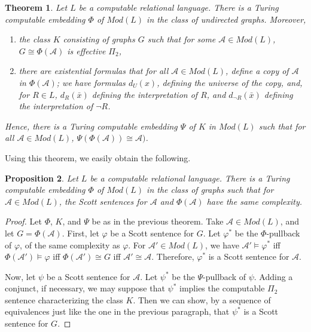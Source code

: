 \documentclass{article}
\newtheorem{thm}{Theorem}[section]
\newtheorem{prop}[thm]{Proposition}
\begin{document}
\begin{thm}

Let $L$ be a computable relational language.  There is a Turing computable embedding $\Phi$ of $Mod(L)$ in the class of undirected graphs.  Moreover, 

\begin{enumerate}

\item  the class $K$ consisting of graphs $G$ such that for some $\mathcal{A}\in Mod(L)$, $G\cong\Phi(\mathcal{A})$ is effective $\Pi_2$, 

\item  there are existential formulas that for all $\mathcal{A}\in Mod(L)$, define a copy of $\mathcal{A}$ in $\Phi(\mathcal{A})$; we have formulas $d_U(x)$, defining the universe of the copy, and, for $R\in L$, $d_R(\bar{x})$ defining the interpretation of $R$, and $d_{\neg{R}}(\bar{x})$ defining the interpretation of $\neg{R}$.  

\end{enumerate}
Hence, there is a Turing computable embedding $\Psi$ of $K$ in $Mod(L)$ such that for all $\mathcal{A}\in Mod(L)$, $\Psi(\Phi(\mathcal{A}))\cong\mathcal{A})$.  

\end{thm} 

Using this theorem, we easily obtain the following.

\begin{prop} 

Let $L$ be a computable relational language.  There is a Turing computable embedding $\Phi$ of $Mod(L)$ in the class of graphs such that for $\mathcal{A}\in Mod(L)$, the Scott sentences for $\mathcal{A}$ and $\Phi(\mathcal{A})$ have the same complexity.

\end{prop}

\begin{proof}

Let $\Phi$, $K$, and $\Psi$ be as in the previous theorem.  Take $\mathcal{A}\in Mod(L)$, and let $G = \Phi(\mathcal{A})$.  First, let $\varphi$ be a Scott sentence for $G$.  Let $\varphi^*$ be the $\Phi$-pullback of $\varphi$, of the same complexity as $\varphi$.  For $\mathcal{A}'\in Mod(L)$, we have $\mathcal{A}'\models\varphi^*$ iff $\Phi(\mathcal{A}')\models\varphi$ iff $\Phi(\mathcal{A}')\cong G$ iff $\mathcal{A}'\cong\mathcal{A}$.  Therefore, $\varphi^*$ is a Scott sentence for $\mathcal{A}$.

Now, let $\psi$ be a Scott sentence for $\mathcal{A}$.  Let $\psi^*$ be the $\Psi$-pullback of $\psi$.  Adding a conjunct, if necessary, we may suppose that $\psi^*$ implies the computable $\Pi_2$ sentence characterizing the class $K$.  Then we can show, by a sequence of equivalences just like the one in the previous paragraph, that $\psi^*$ is a Scott sentence for $G$. 
\end{proof}
\end{document}
